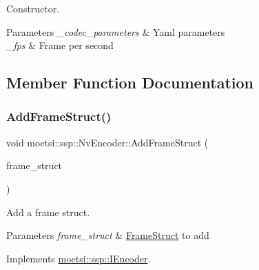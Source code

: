 Constructor. 


\begin{DoxyParams}{Parameters}
{\em \+\_\+codec\+\_\+parameters} & Yaml parameters \\
\hline
{\em \+\_\+fps} & Frame per second \\
\hline
\end{DoxyParams}


\subsection{Member Function Documentation}
\mbox{\label{classmoetsi_1_1ssp_1_1NvEncoder_a99fbcbd5f04c5b3b395167badbf84b2f}} 
\subsubsection{\texorpdfstring{Add\+Frame\+Struct()}{AddFrameStruct()}}
{\footnotesize\ttfamily void moetsi\+::ssp\+::\+Nv\+Encoder\+::\+Add\+Frame\+Struct (\begin{DoxyParamCaption}\item[{std\+::shared\+\_\+ptr$<$ \hyperlink{structmoetsi_1_1ssp_1_1FrameStruct}{Frame\+Struct} $>$ \&}]{frame\+\_\+struct }\end{DoxyParamCaption})\hspace{0.3cm}{\ttfamily [pure virtual]}}



Add a frame struct. 


\begin{DoxyParams}{Parameters}
{\em frame\+\_\+struct} & \hyperlink{structmoetsi_1_1ssp_1_1FrameStruct}{Frame\+Struct} to add \\
\hline
\end{DoxyParams}


Implements \hyperlink{classmoetsi_1_1ssp_1_1IEncoder_a8c223ec82fdd30ee8ee75157306054ec}{moetsi\+::ssp\+::\+I\+Encoder}.

\mbox{\label{classmoetsi_1_1ssp_1_1NvEncoder_adbc7d498e797af8c5bb31b5a2a82efdd}} 
